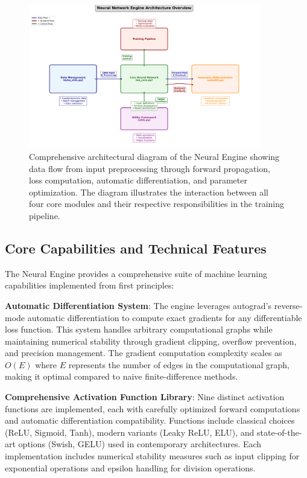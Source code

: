 \documentclass[11pt,a4paper]{report}
\begin{document}
\begin{figure}[H]
\centering
\includegraphics[width=0.9\textwidth]{engine_overview_diagram.png}
\caption{Comprehensive architectural diagram of the Neural Engine showing data flow from input preprocessing through forward propagation, loss computation, automatic differentiation, and parameter optimization. The diagram illustrates the interaction between all four core modules and their respective responsibilities in the training pipeline.}
\label{fig:engine_overview}
\end{figure}

\subsection{Core Capabilities and Technical Features}

The Neural Engine provides a comprehensive suite of machine learning capabilities implemented from first principles:

\textbf{Automatic Differentiation System}: The engine leverages autograd's reverse-mode automatic differentiation to compute exact gradients for any differentiable loss function. This system handles arbitrary computational graphs while maintaining numerical stability through gradient clipping, overflow prevention, and precision management. The gradient computation complexity scales as $O(E)$ where $E$ represents the number of edges in the computational graph, making it optimal compared to naive finite-difference methods.

\textbf{Comprehensive Activation Function Library}: Nine distinct activation functions are implemented, each with carefully optimized forward computations and automatic differentiation compatibility. Functions include classical choices (ReLU, Sigmoid, Tanh), modern variants (Leaky ReLU, ELU), and state-of-the-art options (Swish, GELU) used in contemporary architectures. Each implementation includes numerical stability measures such as input clipping for exponential operations and epsilon handling for division operations.
\end{document}
